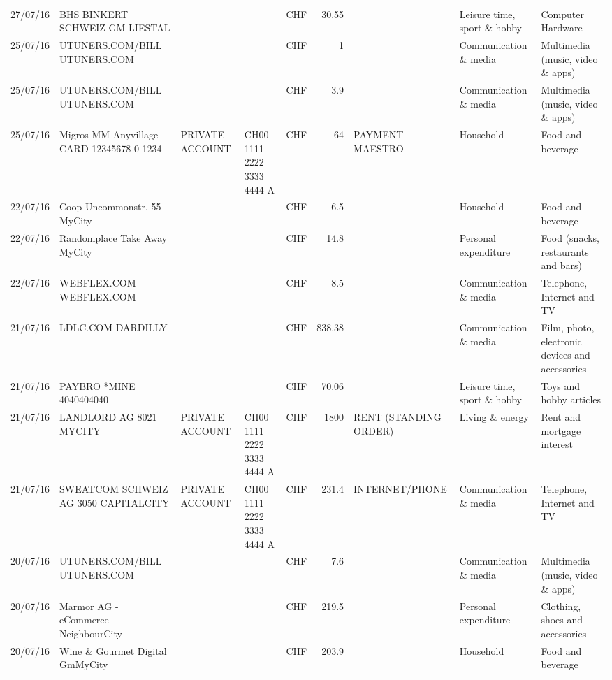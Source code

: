 \begin{landscape}
\begin{table}[h]
\begin{center}
\begin{tabular}{rllllrlll}
		27/07/16 & BHS BINKERT SCHWEIZ GM   LIESTAL &       &       & CHF   & 30.55 &       & Leisure time, sport \& hobby & Computer Hardware \\
		25/07/16 & UTUNERS.COM/BILL          UTUNERS.COM &       &       & CHF   & 1     &       & Communication \& media & Multimedia (music, video \& apps) \\
		25/07/16 & UTUNERS.COM/BILL          UTUNERS.COM &       &       & CHF   & 3.9   &       & Communication \& media & Multimedia (music, video \& apps) \\
		25/07/16 & Migros MM Anyvillage CARD 12345678-0 1234 & PRIVATE ACCOUNT & CH00 1111 2222 3333 4444 A & CHF   & 64    & PAYMENT MAESTRO & Household & Food and beverage \\
		22/07/16 & Coop Uncommonstr. 55   MyCity &       &       & CHF   & 6.5   &       & Household & Food and beverage \\
		22/07/16 & Randomplace Take Away     MyCity &       &       & CHF   & 14.8  &       & Personal expenditure & Food (snacks, restaurants and bars) \\
		22/07/16 & WEBFLEX.COM              WEBFLEX.COM &       &       & CHF   & 8.5   &       & Communication \& media & Telephone,  Internet and TV \\
		21/07/16 & LDLC.COM                 DARDILLY &       &       & CHF   & 838.38 &       & Communication \& media & Film, photo, electronic devices and accessories \\
		21/07/16 & PAYBRO *MINE       4040404040 &       &       & CHF   & 70.06 &       & Leisure time, sport \& hobby & Toys and hobby articles \\
		21/07/16 & LANDLORD AG 8021 MYCITY & PRIVATE ACCOUNT & CH00 1111 2222 3333 4444 A & CHF   & 1800  & RENT (STANDING ORDER) & Living \& energy & Rent and mortgage interest \\
		21/07/16 & SWEATCOM SCHWEIZ AG 3050 CAPITALCITY & PRIVATE ACCOUNT & CH00 1111 2222 3333 4444 A & CHF   & 231.4 & INTERNET/PHONE & Communication \& media & Telephone,  Internet and TV \\
		20/07/16 & UTUNERS.COM/BILL          UTUNERS.COM &       &       & CHF   & 7.6   &       & Communication \& media & Multimedia (music, video \& apps) \\
		20/07/16 & Marmor AG - eCommerce     NeighbourCity &       &       & CHF   & 219.5 &       & Personal expenditure & Clothing, shoes and accessories \\
		20/07/16 & Wine \& Gourmet Digital GmMyCity &       &       & CHF   & 203.9 &       & Household & Food and beverage \\

\end{tabular}
\end{center}
\end{table}
\end{landscape}
